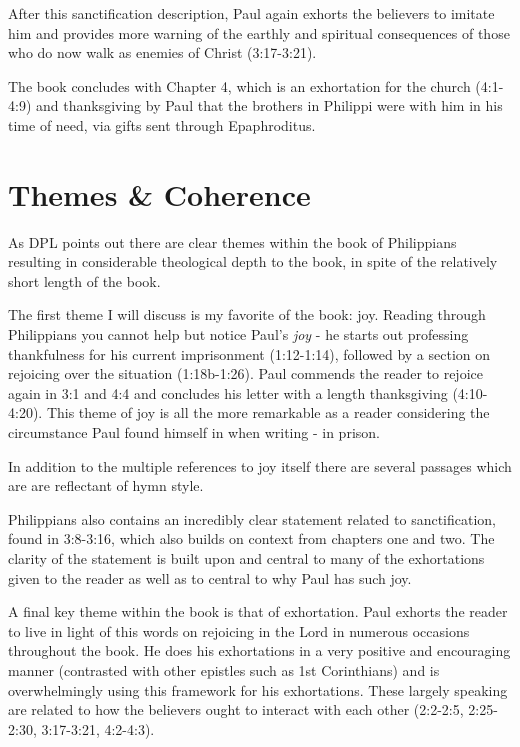 \documentclass[12pt]{turabian-researchpaper}
\begin{document}
After this sanctification description, Paul again exhorts the believers to imitate him and provides more warning of the earthly and spiritual consequences of those who do now walk as enemies of Christ (3:17-3:21).

The book concludes with Chapter 4, which is an exhortation for the church (4:1-4:9) and thanksgiving by Paul that the brothers in Philippi were with him in his time of need, via gifts sent through Epaphroditus.

\section{Themes \& Coherence}

As DPL points out there are clear themes within the book of Philippians resulting in considerable theological depth to the book, in spite of the relatively short length of the book.\autocite[pg. 712]{hawthorne2009dictionary}

The first theme I will discuss is my favorite of the book: joy. Reading through Philippians you cannot help but notice Paul's \textit{joy} - he starts out professing thankfulness for his current imprisonment (1:12-1:14), followed by a section on rejoicing over the situation (1:18b-1:26). Paul commends the reader to rejoice again in 3:1 and 4:4 and concludes his letter with a length thanksgiving (4:10-4:20). This theme of joy is all the more remarkable as a reader considering the circumstance Paul found himself in when writing - in prison.

In addition to the multiple references to joy itself there are several passages which are are reflectant of hymn style.\autocite{hawthorne2009dictionary}

Philippians also contains an incredibly clear statement related to sanctification, found in 3:8-3:16\autocite[pg. 713]{hawthorne2009dictionary}, which also builds on context from chapters one and two. The clarity of the statement is built upon and central to many of the exhortations given to the reader as well as to central to why Paul has such joy.

A final key theme within the book is that of exhortation. Paul exhorts the reader to live in light of this words on rejoicing in the Lord in numerous occasions throughout the book. He does his exhortations in a very positive and encouraging manner (contrasted with other epistles such as 1st Corinthians) and is overwhelmingly using this framework for his exhortations. These largely speaking are related to how the believers ought to interact with each other (2:2-2:5, 2:25-2:30, 3:17-3:21, 4:2-4:3). 

\newpage


\printbibliography
\end{document}
